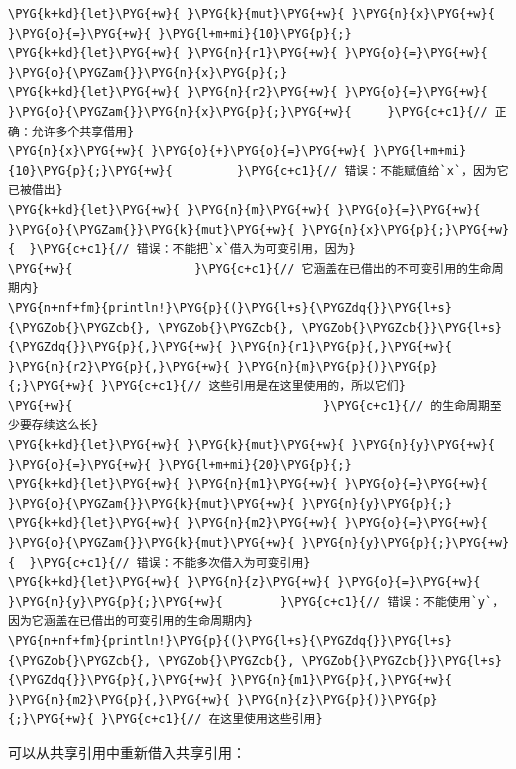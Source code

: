 \begin{Verbatim}[commandchars=\\\{\},breaklines=true,breakanywhere=true,fontsize=\codefont,xleftmargin=17bp]
\PYG{k+kd}{let}\PYG{+w}{ }\PYG{k}{mut}\PYG{+w}{ }\PYG{n}{x}\PYG{+w}{ }\PYG{o}{=}\PYG{+w}{ }\PYG{l+m+mi}{10}\PYG{p}{;}
\PYG{k+kd}{let}\PYG{+w}{ }\PYG{n}{r1}\PYG{+w}{ }\PYG{o}{=}\PYG{+w}{ }\PYG{o}{\PYGZam{}}\PYG{n}{x}\PYG{p}{;}
\PYG{k+kd}{let}\PYG{+w}{ }\PYG{n}{r2}\PYG{+w}{ }\PYG{o}{=}\PYG{+w}{ }\PYG{o}{\PYGZam{}}\PYG{n}{x}\PYG{p}{;}\PYG{+w}{     }\PYG{c+c1}{// 正确：允许多个共享借用}
\PYG{n}{x}\PYG{+w}{ }\PYG{o}{+}\PYG{o}{=}\PYG{+w}{ }\PYG{l+m+mi}{10}\PYG{p}{;}\PYG{+w}{         }\PYG{c+c1}{// 错误：不能赋值给`x`，因为它已被借出}
\PYG{k+kd}{let}\PYG{+w}{ }\PYG{n}{m}\PYG{+w}{ }\PYG{o}{=}\PYG{+w}{ }\PYG{o}{\PYGZam{}}\PYG{k}{mut}\PYG{+w}{ }\PYG{n}{x}\PYG{p}{;}\PYG{+w}{  }\PYG{c+c1}{// 错误：不能把`x`借入为可变引用，因为}
\PYG{+w}{                 }\PYG{c+c1}{// 它涵盖在已借出的不可变引用的生命周期内}
\PYG{n+nf+fm}{println!}\PYG{p}{(}\PYG{l+s}{\PYGZdq{}}\PYG{l+s}{\PYGZob{}\PYGZcb{}, \PYGZob{}\PYGZcb{}, \PYGZob{}\PYGZcb{}}\PYG{l+s}{\PYGZdq{}}\PYG{p}{,}\PYG{+w}{ }\PYG{n}{r1}\PYG{p}{,}\PYG{+w}{ }\PYG{n}{r2}\PYG{p}{,}\PYG{+w}{ }\PYG{n}{m}\PYG{p}{)}\PYG{p}{;}\PYG{+w}{ }\PYG{c+c1}{// 这些引用是在这里使用的，所以它们}
\PYG{+w}{                                   }\PYG{c+c1}{// 的生命周期至少要存续这么长}
\PYG{k+kd}{let}\PYG{+w}{ }\PYG{k}{mut}\PYG{+w}{ }\PYG{n}{y}\PYG{+w}{ }\PYG{o}{=}\PYG{+w}{ }\PYG{l+m+mi}{20}\PYG{p}{;}
\PYG{k+kd}{let}\PYG{+w}{ }\PYG{n}{m1}\PYG{+w}{ }\PYG{o}{=}\PYG{+w}{ }\PYG{o}{\PYGZam{}}\PYG{k}{mut}\PYG{+w}{ }\PYG{n}{y}\PYG{p}{;}
\PYG{k+kd}{let}\PYG{+w}{ }\PYG{n}{m2}\PYG{+w}{ }\PYG{o}{=}\PYG{+w}{ }\PYG{o}{\PYGZam{}}\PYG{k}{mut}\PYG{+w}{ }\PYG{n}{y}\PYG{p}{;}\PYG{+w}{  }\PYG{c+c1}{// 错误：不能多次借入为可变引用}
\PYG{k+kd}{let}\PYG{+w}{ }\PYG{n}{z}\PYG{+w}{ }\PYG{o}{=}\PYG{+w}{ }\PYG{n}{y}\PYG{p}{;}\PYG{+w}{        }\PYG{c+c1}{// 错误：不能使用`y`，因为它涵盖在已借出的可变引用的生命周期内}
\PYG{n+nf+fm}{println!}\PYG{p}{(}\PYG{l+s}{\PYGZdq{}}\PYG{l+s}{\PYGZob{}\PYGZcb{}, \PYGZob{}\PYGZcb{}, \PYGZob{}\PYGZcb{}}\PYG{l+s}{\PYGZdq{}}\PYG{p}{,}\PYG{+w}{ }\PYG{n}{m1}\PYG{p}{,}\PYG{+w}{ }\PYG{n}{m2}\PYG{p}{,}\PYG{+w}{ }\PYG{n}{z}\PYG{p}{)}\PYG{p}{;}\PYG{+w}{ }\PYG{c+c1}{// 在这里使用这些引用}
\end{Verbatim}

可以从共享引用中重新借入共享引用：

